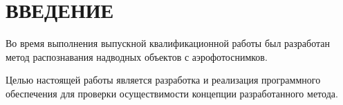 \chapter*{ВВЕДЕНИЕ}

Во время выполнения выпускной квалификационной работы был разработан метод распознавания надводных объектов с аэрофотоснимков.

Целью настоящей работы является разработка и реализация программного обеспечения для проверки осуществимости концепции разработанного метода.